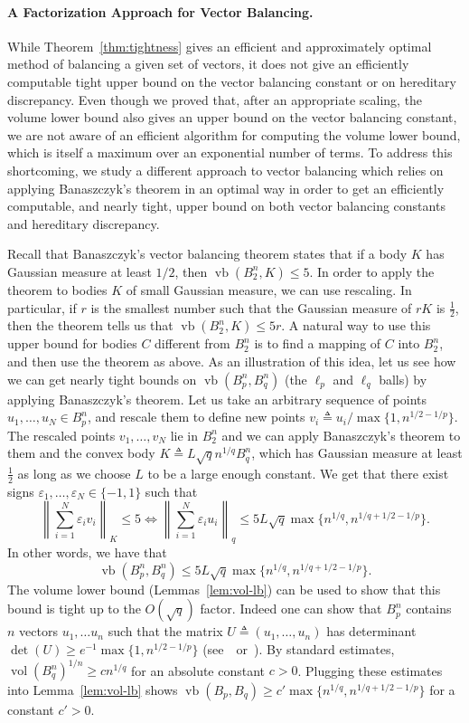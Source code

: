 \documentclass[11pt]{article}
\newcommand\eps{\varepsilon}
\newcommand{\eqdef}{\triangleq}
\DeclareMathOperator{\vb}{vb}
\DeclareMathOperator{\vol}{vol}
\begin{document}
\paragraph{\bf A Factorization Approach for Vector Balancing.}   

While Theorem~\ref{thm:tightness} gives an efficient and approximately
optimal method of balancing a given set of vectors, it does not give
an efficiently computable tight upper bound on the vector balancing constant
or on hereditary discrepancy. Even though we proved that, after an
appropriate scaling, the volume lower bound also gives an upper bound
on the vector balancing constant, we are not aware of an efficient
algorithm for computing the volume lower bound, which is itself a
maximum over an exponential number of terms. To address this
shortcoming, we study a different approach to vector balancing which
relies on applying Banaszczyk's theorem in an optimal
way in order to get an efficiently computable, and nearly tight, upper
bound on both vector balancing constants and hereditary discrepancy.

Recall that Banaszczyk's vector balancing theorem states that if a
body $K$ has Gaussian measure at least $1/2$, then $\vb(B_2^n, K) \le
5$. In order to apply the theorem to bodies $K$ of small Gaussian
measure, we can use rescaling.  In particular, if $r$ is the smallest
number such that the Gaussian measure of $rK$ is $\frac12$, then the
theorem tells us that $\vb(B_2^n, K) \le 5r$. A natural way to use
this upper bound for bodies $C$ different from $B_2^n$ is to find a
mapping of $C$ into $B_2^n$, and then use the theorem as above. As an
illustration of this idea, let us see how we can get nearly tight
bounds on $\vb(B^n_p, B^n_q)$ (the $\ell_p$ and $\ell_q$ balls) by
applying Banaszczyk's theorem. Let us take an arbitrary sequence of
points $u_1, \ldots, u_N \in B_p^n$, and rescale them to define new
points $v_i \eqdef {u_i}/{\max\{1, n^{1/2 -1/p}\}}$. The rescaled
points $v_1, \ldots, v_N$ lie in $B_2^n$ and we can apply Banaszczyk's
theorem to them and the convex body $K \eqdef L \sqrt{q} n^{1/q}
B_q^n$, which has Gaussian measure at least $\frac12$ as long as we
choose $L$ to be a large enough constant. We get that there exist
signs $\eps_1, \ldots, \eps_N \in \{-1, 1\}$ such that
\[
\left\|\sum_{i = 1}^N{\eps_i v_i}\right\|_K \le 5
\iff
\left\|\sum_{i = 1}^N{\eps_i u_i}\right\|_q \le
 5L\sqrt{q}\max\{n^{1/q}, n^{1/q + 1/2 -1/p}\}. 
\]
In other words, we have that 
\[
\vb(B_p^n, B_q^n) \le
5L\sqrt{q}\max\{n^{1/q}, n^{1/q + 1/2 -1/p}\}.
\]
The volume lower bound (Lemmas~\ref{lem:vol-lb}) can be used to show
that this bound is tight up to the $O(\sqrt{q})$ factor. Indeed one
can show that $B_p^n$ contains $n$ vectors $u_1, \ldots u_n$ such that
the matrix $U \eqdef (u_1, \ldots, u_n)$ has determinant $\det(U) \ge
e^{-1} \max\{1, n^{1/2 -1/p}\}$ (see~\cite{Ball89}~or~\cite{N15}). By
standard estimates, $\vol(B_q^n)^{1/n} \ge c n^{1/q}$ for an absolute
constant $c >0$. Plugging these estimates into Lemma~\ref{lem:vol-lb}
shows $\vb(B_p, B_q) \ge c' \max\{n^{1/q}, n^{1/q + 1/2 -1/p}\}$ for a
constant $c' > 0$.
\end{document}
